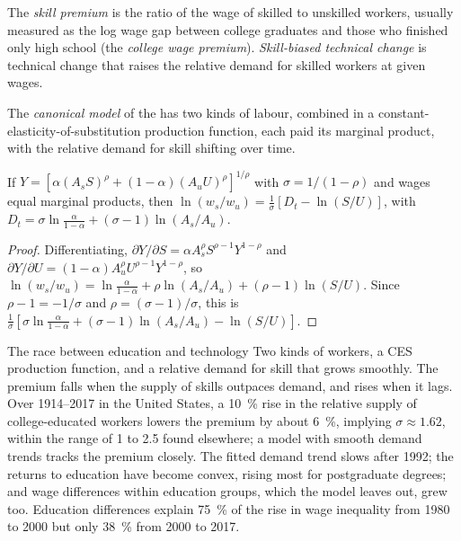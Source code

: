 \begin{definition}\label{def:b3:wage-structure:skill-premium}
The \emph{skill premium} is the ratio of the wage of skilled to unskilled workers,
usually measured as the log wage gap between college graduates and those who
finished only high school (the \emph{college wage premium}). \emph{Skill-biased
technical change} is technical change that raises the relative demand for
skilled workers at given wages.
\end{definition}

\begin{definition}\label{def:b3:wage-structure:canonical}
The \emph{canonical model} of the  has two kinds of labour, combined
in a constant-elasticity-of-substitution production function, each paid its
marginal product, with the relative demand for skill shifting over time.
\end{definition}

\begin{proposition}\label{prop:b3:wage-structure:katz-murphy}
If $Y = [\alpha(A_sS)^\rho + (1 - \alpha)(A_uU)^\rho]^{1/\rho}$ with $\sigma = 1/(1 - \rho)$ and wages equal marginal products, then
$\ln(w_s/w_u) = \tfrac1\sigma[D_t - \ln(S/U)]$, with $D_t = \sigma\ln\tfrac{\alpha}{1-\alpha} + (\sigma - 1)\ln(A_s/A_u)$.
\end{proposition}

\begin{proof}
Differentiating, $\partial Y/\partial S = \alpha A_s^\rho S^{\rho-1}Y^{1-\rho}$ and $\partial Y/\partial U = (1 - \alpha)A_u^\rho U^{\rho-1}Y^{1-\rho}$, so $\ln(w_s/w_u) =
\ln\tfrac{\alpha}{1-\alpha} + \rho\ln(A_s/A_u) + (\rho - 1)\ln(S/U)$. Since $\rho - 1 = -1/\sigma$ and $\rho = (\sigma - 1)/\sigma$, this is $\tfrac1\sigma[\sigma\ln\tfrac{\alpha}{1-\alpha}
+ (\sigma - 1)\ln(A_s/A_u) - \ln(S/U)]$.
\end{proof}

\begin{model}{The race between education and technology}
\assumes Two kinds of workers, a CES production function, and a relative demand
for skill that grows smoothly.
\predicts The premium falls when the supply of skills outpaces demand, and rises
when it lags.
\tested Over 1914--2017 in the United States, a 10~\% rise in the relative supply of
college-educated workers lowers the premium by about 6~\%, implying $\sigma \approx 1.62$, within the
range of 1 to 2.5 found elsewhere; a model with smooth demand trends tracks the premium
closely. %
\breaks The fitted demand trend slows after 1992; the returns to education have
become convex, rising most for postgraduate degrees; and wage differences within
education groups, which the model leaves out, grew too. Education differences
explain 75~\% of the rise in wage inequality from 1980 to 2000 but only 38~\% from 2000 to 2017.
\end{model}

